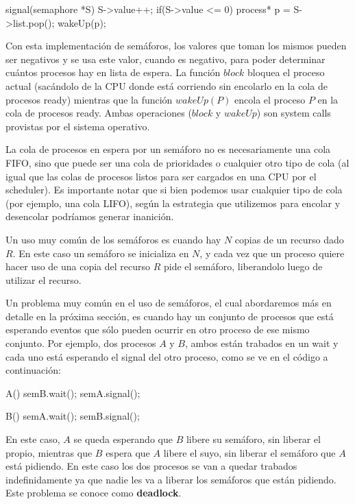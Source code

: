 \documentclass{article}
\begin{document}
\begin{code}
signal(semaphore *S)
{
    S->value++;
		if(S->value <= 0)
		{
		    process* p = S->list.pop();
		    wakeUp(p);
		}
}
\end{code}

Con esta implementaci\'on de sem\'aforos, los valores que toman los mismos pueden ser negativos y se usa este valor, cuando es negativo, para poder determinar cu\'antos procesos hay en lista de espera. La funci\'on $block$ bloquea el proceso actual (sac\'andolo de la CPU donde est\'a corriendo sin encolarlo en la cola de procesos ready) mientras que la funci\'on $wakeUp(P)$ encola el proceso $P$ en la cola de procesos ready. Ambas operaciones ($block$ y $wakeUp$) son system calls provistas por el sistema operativo.

La cola de procesos en espera por un sem\'aforo no es necesariamente una cola FIFO, sino que puede ser una cola de prioridades o cualquier otro tipo de cola (al igual que las colas de procesos listos para ser cargados en una CPU por el scheduler). Es importante notar que si bien podemos usar cualquier tipo de cola (por ejemplo, una cola LIFO), seg\'un la estrategia que utilizemos para encolar y desencolar podr\'iamos generar inanici\'on.

Un uso muy com\'un de los sem\'aforos es cuando hay $N$ copias de un recurso dado $R$. En este caso un sem\'aforo se inicializa en $N$, y cada vez que un proceso quiere hacer uso de una copia del recurso $R$ pide el sem\'aforo, liberandolo luego de utilizar el recurso.

Un problema muy com\'un en el uso de sem\'aforos, el cual abordaremos m\'as en detalle en la pr\'oxima secci\'on, es cuando hay un conjunto de procesos que est\'a esperando eventos que s\'olo pueden ocurrir en otro proceso de ese mismo conjunto. Por ejemplo, dos procesos $A$ y $B$, ambos est\'an trabados en un wait y cada uno est\'a esperando el signal del otro proceso, como se ve en el c\'odigo a continuaci\'on:

\begin{code}
A()
{
    semB.wait();
		semA.signal();
}
\end{code}

\begin{code}
B()
{
    semA.wait();
		semB.signal();
}
\end{code}

En este caso, $A$ se queda esperando que $B$ libere su sem\'aforo, sin liberar el propio, mientras que $B$ espera que $A$ libere el suyo, sin liberar el sem\'aforo que $A$ est\'a pidiendo. En este caso los dos procesos se van a quedar trabados indefinidamente ya que nadie les va a liberar los sem\'aforos que est\'an pidiendo. Este problema se conoce como \textbf{deadlock}.
\end{document}
